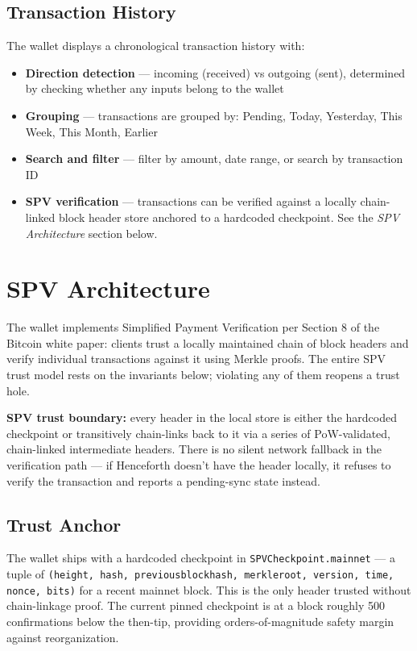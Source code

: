 \documentclass[a4paper, 11pt, openany]{book}
\begin{document}
\subsection{Transaction History}

The wallet displays a chronological transaction history with:

\begin{itemize}
\item \textbf{Direction detection} --- incoming (received) vs outgoing (sent), determined by checking whether any inputs belong to the wallet
\item \textbf{Grouping} --- transactions are grouped by: Pending, Today, Yesterday, This Week, This Month, Earlier
\item \textbf{Search and filter} --- filter by amount, date range, or search by transaction ID
\item \textbf{SPV verification} --- transactions can be verified against a locally chain-linked block header store anchored to a hardcoded checkpoint. See the \emph{SPV Architecture} section below.
\end{itemize}

\section{SPV Architecture}

The wallet implements Simplified Payment Verification per Section 8 of the Bitcoin white paper: clients trust a locally maintained chain of block headers and verify individual transactions against it using Merkle proofs. The entire SPV trust model rests on the invariants below; violating any of them reopens a trust hole.

\begin{notebox}
\textbf{SPV trust boundary:} every header in the local store is either the hardcoded checkpoint or transitively chain-links back to it via a series of PoW-validated, chain-linked intermediate headers. There is no silent network fallback in the verification path --- if Henceforth doesn't have the header locally, it refuses to verify the transaction and reports a pending-sync state instead.
\end{notebox}

\subsection{Trust Anchor}

The wallet ships with a hardcoded checkpoint in \texttt{SPVCheckpoint.mainnet} --- a tuple of \texttt{(height, hash, previousblockhash, merkleroot, version, time, nonce, bits)} for a recent mainnet block. This is the only header trusted without chain-linkage proof. The current pinned checkpoint is at a block roughly 500 confirmations below the then-tip, providing orders-of-magnitude safety margin against reorganization.
\end{document}

